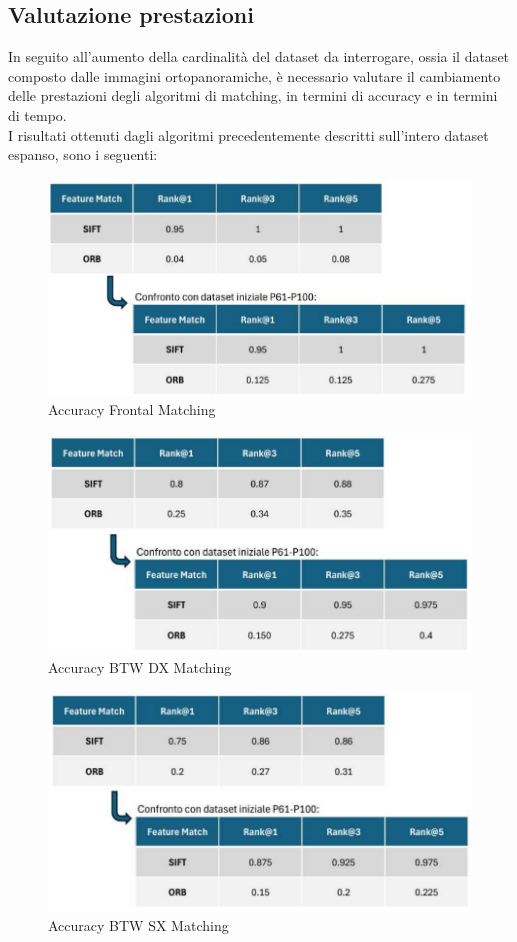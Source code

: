 \documentclass[12pt,a4paper,openright,twoside]{book}
\begin{document}
\subsection{Valutazione prestazioni}
In seguito all'aumento della cardinalità del dataset da interrogare, ossia il dataset composto dalle immagini ortopanoramiche, è necessario valutare il cambiamento delle prestazioni degli algoritmi di matching, in termini di accuracy e in termini di tempo.\\
I risultati ottenuti dagli algoritmi precedentemente descritti sull'intero dataset espanso, sono i seguenti:
\begin{figure}[H]
	\centering
	\includegraphics{figures/frontal1_1.pdf}
    	\caption{Accuracy Frontal Matching}
	\label{fig:frontal1}
\end{figure}
\begin{figure}[H]
	\centering
	\includegraphics{figures/dx1_1.pdf}
   	\caption{Accuracy BTW DX Matching}
	\label{fig:dx1}
\end{figure}
\begin{figure}[H]
	\centering
	\includegraphics{figures/sx1_1.pdf}
   	\caption{Accuracy BTW SX Matching}
	\label{fig:sx1}
\end{figure}
\end{document}
